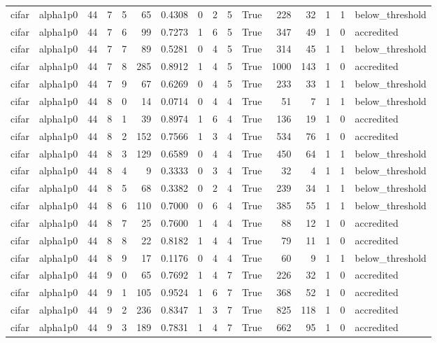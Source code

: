 \begin{tabular}{llrrrrrrrrrrrrrl}
cifar & alpha1p0 & 44 & 7 & 5 & 65 & 0.4308 & 0 & 2 & 5 & True & 228 & 32 & 1 & 1 & below\_threshold \\
cifar & alpha1p0 & 44 & 7 & 6 & 99 & 0.7273 & 1 & 6 & 5 & True & 347 & 49 & 1 & 0 & accredited \\
cifar & alpha1p0 & 44 & 7 & 7 & 89 & 0.5281 & 0 & 4 & 5 & True & 314 & 45 & 1 & 1 & below\_threshold \\
cifar & alpha1p0 & 44 & 7 & 8 & 285 & 0.8912 & 1 & 4 & 5 & True & 1000 & 143 & 1 & 0 & accredited \\
cifar & alpha1p0 & 44 & 7 & 9 & 67 & 0.6269 & 0 & 4 & 5 & True & 233 & 33 & 1 & 1 & below\_threshold \\
cifar & alpha1p0 & 44 & 8 & 0 & 14 & 0.0714 & 0 & 4 & 4 & True & 51 & 7 & 1 & 1 & below\_threshold \\
cifar & alpha1p0 & 44 & 8 & 1 & 39 & 0.8974 & 1 & 6 & 4 & True & 136 & 19 & 1 & 0 & accredited \\
cifar & alpha1p0 & 44 & 8 & 2 & 152 & 0.7566 & 1 & 3 & 4 & True & 534 & 76 & 1 & 0 & accredited \\
cifar & alpha1p0 & 44 & 8 & 3 & 129 & 0.6589 & 0 & 4 & 4 & True & 450 & 64 & 1 & 1 & below\_threshold \\
cifar & alpha1p0 & 44 & 8 & 4 & 9 & 0.3333 & 0 & 3 & 4 & True & 32 & 4 & 1 & 1 & below\_threshold \\
cifar & alpha1p0 & 44 & 8 & 5 & 68 & 0.3382 & 0 & 2 & 4 & True & 239 & 34 & 1 & 1 & below\_threshold \\
cifar & alpha1p0 & 44 & 8 & 6 & 110 & 0.7000 & 0 & 6 & 4 & True & 385 & 55 & 1 & 1 & below\_threshold \\
cifar & alpha1p0 & 44 & 8 & 7 & 25 & 0.7600 & 1 & 4 & 4 & True & 88 & 12 & 1 & 0 & accredited \\
cifar & alpha1p0 & 44 & 8 & 8 & 22 & 0.8182 & 1 & 4 & 4 & True & 79 & 11 & 1 & 0 & accredited \\
cifar & alpha1p0 & 44 & 8 & 9 & 17 & 0.1176 & 0 & 4 & 4 & True & 60 & 9 & 1 & 1 & below\_threshold \\
cifar & alpha1p0 & 44 & 9 & 0 & 65 & 0.7692 & 1 & 4 & 7 & True & 226 & 32 & 1 & 0 & accredited \\
cifar & alpha1p0 & 44 & 9 & 1 & 105 & 0.9524 & 1 & 6 & 7 & True & 368 & 52 & 1 & 0 & accredited \\
cifar & alpha1p0 & 44 & 9 & 2 & 236 & 0.8347 & 1 & 3 & 7 & True & 825 & 118 & 1 & 0 & accredited \\
cifar & alpha1p0 & 44 & 9 & 3 & 189 & 0.7831 & 1 & 4 & 7 & True & 662 & 95 & 1 & 0 & accredited \\

\end{tabular}
